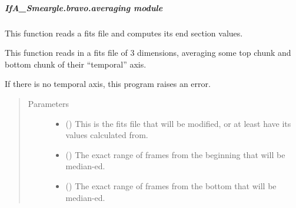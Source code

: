 \documentclass[letterpaper,10pt,english]{sphinxmanual}
\begin{document}
\subparagraph{IfA\_Smeargle.bravo.averaging module}
\label{\detokenize{python_docstrings/IfA_Smeargle.bravo.averaging:module-IfA_Smeargle.bravo.averaging}}\label{\detokenize{python_docstrings/IfA_Smeargle.bravo.averaging:ifa-smeargle-bravo-averaging-module}}\label{\detokenize{python_docstrings/IfA_Smeargle.bravo.averaging::doc}}

\begin{fulllineitems}
\label{\detokenize{python_docstrings/IfA_Smeargle.bravo.averaging:IfA_Smeargle.bravo.averaging.median_endpoints}}
This function reads a fits file and computes its end section values.

This function reads in a fits file of 3 dimensions, averaging some
top chunk and bottom chunk of their “temporal” axis.

If there is no temporal axis, this program raises an error.
\begin{quote}\begin{description}
\item[{Parameters}] \leavevmode\begin{itemize}
\item {} 
 () \textendash{} This is the fits file that will be modified, or at least have its
values calculated from.

\item {} 
 () \textendash{} The exact range of frames from the beginning that will be median-ed.

\item {} 
 () \textendash{} The exact range of frames from the bottom that will be median-ed.


\end{itemize}
\end{description}
\end{quote}
\end{fulllineitems}
\end{document}
